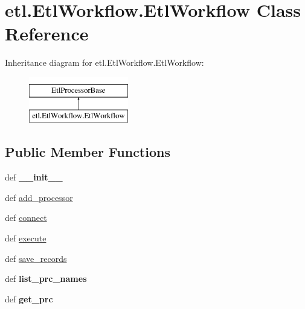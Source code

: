 \hypertarget{classetl_1_1EtlWorkflow_1_1EtlWorkflow}{\section{etl.\-Etl\-Workflow.\-Etl\-Workflow Class Reference}
\label{classetl_1_1EtlWorkflow_1_1EtlWorkflow}
}
Inheritance diagram for etl.\-Etl\-Workflow.\-Etl\-Workflow\-:\begin{figure}[H]
\begin{center}
\leavevmode
\includegraphics[height=2.000000cm]{classetl_1_1EtlWorkflow_1_1EtlWorkflow}
\end{center}
\end{figure}
\subsection*{Public Member Functions}
\begin{DoxyCompactItemize}
\item 
\hypertarget{classetl_1_1EtlWorkflow_1_1EtlWorkflow_a1966fd97419f8ccaf6363c4b05fbce3c}{def {\bfseries \-\_\-\-\_\-init\-\_\-\-\_\-}}\label{classetl_1_1EtlWorkflow_1_1EtlWorkflow_a1966fd97419f8ccaf6363c4b05fbce3c}

\item 
def \hyperlink{classetl_1_1EtlWorkflow_1_1EtlWorkflow_a0027ab0811e6b677f28ca6d58f28f823}{add\-\_\-processor}
\item 
def \hyperlink{classetl_1_1EtlWorkflow_1_1EtlWorkflow_a008c9d5aafebcce7b0aab326b1c51e6b}{connect}
\item 
def \hyperlink{classetl_1_1EtlWorkflow_1_1EtlWorkflow_a4f71423ab6481714ba85cfe16291bd42}{execute}
\item 
def \hyperlink{classetl_1_1EtlWorkflow_1_1EtlWorkflow_aae398dcde51ad92c1592a548f71657b6}{save\-\_\-records}
\item 
\hypertarget{classetl_1_1EtlWorkflow_1_1EtlWorkflow_a85e71dd38d728fbe563577f38d332c29}{def {\bfseries list\-\_\-prc\-\_\-names}}\label{classetl_1_1EtlWorkflow_1_1EtlWorkflow_a85e71dd38d728fbe563577f38d332c29}

\item 
\hypertarget{classetl_1_1EtlWorkflow_1_1EtlWorkflow_a9f0f6e2d6be094538942928106c1f180}{def {\bfseries get\-\_\-prc}}\label{classetl_1_1EtlWorkflow_1_1EtlWorkflow_a9f0f6e2d6be094538942928106c1f180}

\end{DoxyCompactItemize}
